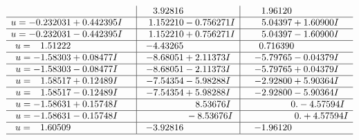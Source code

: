 \documentclass[1p]{elsarticle_modified}
\theoremstyle{definition}
\begin{document}
$$\begin{array}{c|c|c}
 & \phantom{-}3.92816\phantom{ +0.000000I} & \phantom{-}1.96120\phantom{ +0.000000I} \\ \hline\begin{aligned}
u &= -0.232031 + 0.442395 I\end{aligned}
 & \phantom{-}1.152210 - 0.756271 I & \phantom{-}5.04397 + 1.60900 I \\ \hline\begin{aligned}
u &= -0.232031 - 0.442395 I\end{aligned}
 & \phantom{-}1.152210 + 0.756271 I & \phantom{-}5.04397 - 1.60900 I \\ \hline\begin{aligned}
u &= \phantom{-}1.51222\phantom{ +0.000000I}\end{aligned}
 & -4.43265\phantom{ +0.000000I} & \phantom{-}0.716390\phantom{ +0.000000I} \\ \hline\begin{aligned}
u &= -1.58303 + 0.08477 I\end{aligned}
 & -8.68051 + 2.11373 I & -5.79765 - 0.04379 I \\ \hline\begin{aligned}
u &= -1.58303 - 0.08477 I\end{aligned}
 & -8.68051 - 2.11373 I & -5.79765 + 0.04379 I \\ \hline\begin{aligned}
u &= \phantom{-}1.58517 + 0.12489 I\end{aligned}
 & -7.54354 - 5.98288 I & -2.92800 + 5.90364 I \\ \hline\begin{aligned}
u &= \phantom{-}1.58517 - 0.12489 I\end{aligned}
 & -7.54354 + 5.98288 I & -2.92800 - 5.90364 I \\ \hline\begin{aligned}
u &= -1.58631 + 0.15748 I\end{aligned}
 & \phantom{-0.000000 -}8.53676 I & \phantom{-0.000000 } 0. - 4.57594 I \\ \hline\begin{aligned}
u &= -1.58631 - 0.15748 I\end{aligned}
 & \phantom{-0.000000 } -8.53676 I & \phantom{-0.000000 -}0. + 4.57594 I \\ \hline\begin{aligned}
u &= \phantom{-}1.60509\phantom{ +0.000000I}\end{aligned}
 & -3.92816\phantom{ +0.000000I} & -1.96120\phantom{ +0.000000I}\\
 \hline 
 \end{array}$$\newpage
\end{document}
